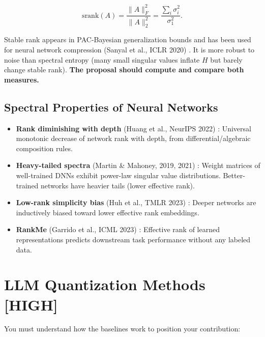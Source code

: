 \documentclass[11pt,a4paper]{article}
\begin{document}
\begin{equation}
    \text{srank}(A) = \frac{\|A\|_F^2}{\|A\|_2^2} = \frac{\sum_i \sigma_i^2}{\sigma_1^2}.
\end{equation}

Stable rank appears in PAC-Bayesian generalization bounds and has been used for neural network compression (Sanyal et al., ICLR 2020) \cite{sanyal2020stable}. It is more robust to noise than spectral entropy (many small singular values inflate $H$ but barely change stable rank). \textbf{The proposal should compute and compare both measures.}

\subsection{Spectral Properties of Neural Networks}

\begin{itemize}
    \item \textbf{Rank diminishing with depth} (Huang et al., NeurIPS 2022) \cite{huang2022rank}: Universal monotonic decrease of network rank with depth, from differential/algebraic composition rules.
    \item \textbf{Heavy-tailed spectra} (Martin \& Mahoney, 2019, 2021) \cite{martin2019traditional, martin2021predicting}: Weight matrices of well-trained DNNs exhibit power-law singular value distributions. Better-trained networks have heavier tails (lower effective rank).
    \item \textbf{Low-rank simplicity bias} (Huh et al., TMLR 2023) \cite{huh2023lowrank}: Deeper networks are inductively biased toward lower effective rank embeddings.
    \item \textbf{RankMe} (Garrido et al., ICML 2023) \cite{garrido2023rankme}: Effective rank of learned representations predicts downstream task performance without any labeled data.
\end{itemize}

\section{LLM Quantization Methods \textnormal{\textcolor{red!70!black}{[HIGH]}}}

You must understand how the baselines work to position your contribution:
\end{document}
